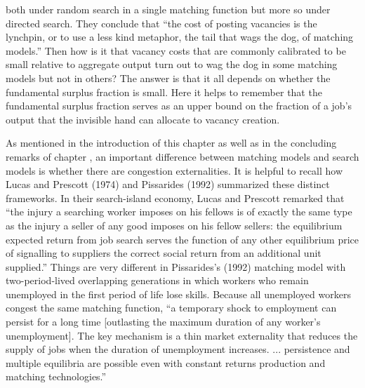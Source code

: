 both under random search in a single matching function but more so
under directed search.
They conclude that ``the cost of posting vacancies is the
lynchpin, or to use a less kind metaphor, the tail that wags the
dog, of matching models.'' Then how is it that vacancy costs that are
commonly calibrated to be small relative to aggregate output turn out to  wag
the dog in some matching models  but not in others? The answer is that it all
depends  on whether  the fundamental surplus
fraction is small.  Here it helps to remember that the fundamental surplus fraction serves as  an upper bound on the fraction of a job's output
that the invisible hand can allocate to vacancy creation.
%
\newpage

As mentioned in the introduction of this chapter as well as
in the concluding remarks of chapter ,
an important difference between  matching models and search models
is whether  there are congestion externalities.  It is helpful to recall how  Lucas
and Prescott (1974) and Pissarides (1992) summarized  these distinct frameworks.  In their search-island
economy, Lucas and Prescott remarked that ``the injury a
searching worker imposes on his fellows is of exactly the same
type as the injury a seller of any good imposes on his fellow
sellers: the equilibrium expected return from job search serves
the function of any other equilibrium price of signalling to
suppliers the correct social return from an additional unit
supplied.'' Things are very different in Pissarides's
(1992) matching model with two-period-lived overlapping
generations in which workers who remain unemployed in the first period of life
lose skills. Because all unemployed workers congest the same
matching function, ``a temporary shock to employment can persist
for a long time [outlasting the maximum duration of any worker's
unemployment]. The key mechanism is a thin market externality
that reduces the supply of jobs when the duration of unemployment
increases. ... persistence and multiple equilibria are possible
even with constant returns production and matching technologies.''

